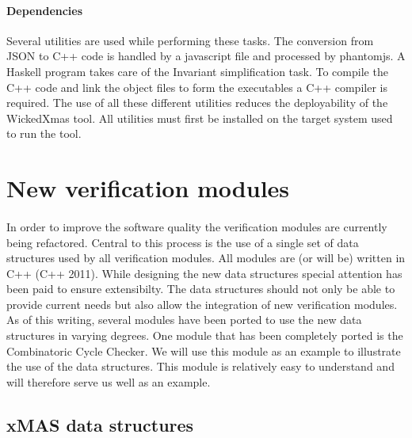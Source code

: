 \documentclass[a4paper,11pt]{article}
\begin{document}
\paragraph{Dependencies}
Several utilities are used while performing these tasks. The conversion from JSON to C++ code is
handled by a javascript file and processed by phantomjs. A Haskell program takes care of the
Invariant simplification task. To compile the C++ code and link the object files to form the
executables a C++ compiler is required. The use of all these different utilities reduces the
deployability of the WickedXmas tool. All utilities must first be installed on the target system used
to run the tool.

\newpage

\section{New verification modules}

\paragraph{}
In order to improve the software quality the verification modules are currently being refactored.
Central to this process is the use of a single set of data structures used by all verification modules.
All modules are (or will be) written in C++ (C++ 2011). While designing the new data structures
special attention has been paid to ensure extensibilty. The data structures should not only be
able to provide current needs but also allow the integration of new verification modules. As of this
writing, several modules have been ported to use the new data structures in varying degrees. One
module that has been completely ported is the Combinatoric Cycle Checker. We will use this module
as an example to illustrate the use of the data structures. This module is relatively easy to
understand and will therefore serve us well as an example.

\subsection{xMAS data structures}
\end{document}
